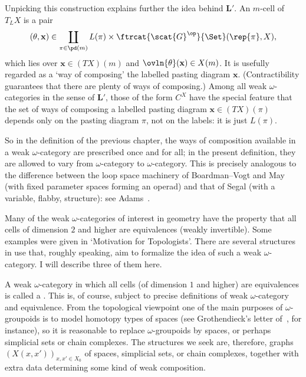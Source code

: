 Unpicking this construction explains further the idea behind $\mathbf{L'}$.
An $m$-cell of $T_L X$ is a pair 
\[
(\theta, \mathbf{x}) 
\in
\coprod_{\pi\in\pd(m)}
L(\pi) 
\times
\ftrcat{\scat{G}^\op}{\Set}(\rep{\pi}, X),
\]
which lies over $\mathbf{x} \in (TX)(m)$ and $\ovln{\theta}(\mathbf{x}) \in
X(m)$.  It is usefully regarded as a `way of composing' the labelled
pasting diagram $\mathbf{x}$.  (Contractibility guarantees that there are
plenty of ways of composing.)  Among all weak $\omega$-categories in the
sense of $\mathbf{L'}$, those of the form $C^X$ have the special feature
that the set of ways of composing a labelled pasting diagram $\mathbf{x}
\in (TX)(\pi)$ depends only on the pasting diagram $\pi$, not on the
labels: it is just $L(\pi)$.

So in the definition of the previous chapter, the ways of composition
available in a weak $\omega$-category are prescribed once and for all; in
the present definition, they are allowed to vary from $\omega$-category to
$\omega$-category.  This is precisely analogous to the difference between
the loop%
%
%
space machinery of Boardman--Vogt%
%
%
%
%
and May%
%
%
(with fixed parameter
spaces forming an operad) and that of Segal%
%
%
(with a variable, flabby,%
%
%
structure): see Adams~\cite[p.~60]{Ad}.%
%
%
%
%
%
%
%



%
%
%
%
%

Many of the weak $\omega$-categories of interest in geometry have the
property that all cells of dimension $2$ and higher are equivalences
(weakly invertible).%
%
%
 Some examples were given in `Motivation for
Topologists'.  There are several structures in use that, roughly speaking,
aim to formalize the idea of such a weak $\omega$-category.  I will
describe three of them here.

A weak $\omega$-category in which all cells (of dimension $1$ and higher)
are equivalences is called a .%
%
%
  This is, of
course, subject to precise definitions of weak $\omega$-category and
equivalence.  From the topological viewpoint one of the main purposes of
$\omega$-groupoids is to model homotopy%
%
%
%
%
types of spaces (see Grothendieck's
letter of~\cite{GroPS}, for instance), so it is reasonable to replace
$\omega$-groupoids by spaces, or perhaps simplicial%
%
%
sets or chain
complexes.%
%
%
  The structures we seek are, therefore, graphs $(X(x,x'))_{x, x'
\in X_0}$ of spaces, simplicial sets, or chain complexes, together with
extra data determining some kind of weak composition.

